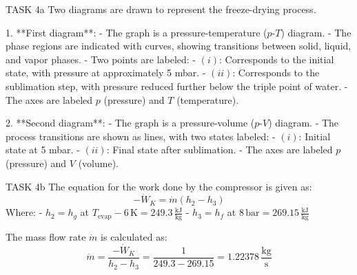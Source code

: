 TASK 4a  
Two diagrams are drawn to represent the freeze-drying process.  

1. **First diagram**:  
   - The graph is a pressure-temperature (\( p \)-\( T \)) diagram.  
   - The phase regions are indicated with curves, showing transitions between solid, liquid, and vapor phases.  
   - Two points are labeled:  
     - \( (i) \): Corresponds to the initial state, with pressure at approximately 5 mbar.  
     - \( (ii) \): Corresponds to the sublimation step, with pressure reduced further below the triple point of water.  
   - The axes are labeled \( p \) (pressure) and \( T \) (temperature).  

2. **Second diagram**:  
   - The graph is a pressure-volume (\( p \)-\( V \)) diagram.  
   - The process transitions are shown as lines, with two states labeled:  
     - \( (i) \): Initial state at 5 mbar.  
     - \( (ii) \): Final state after sublimation.  
   - The axes are labeled \( p \) (pressure) and \( V \) (volume).  

TASK 4b  
The equation for the work done by the compressor is given as:  
\[
-\dot{W}_K = \dot{m} \left( h_2 - h_3 \right)
\]  
Where:  
- \( h_2 = h_g \) at \( T_{\text{evap}} - 6 \, \text{K} = 249.3 \, \frac{\text{kJ}}{\text{kg}} \)  
- \( h_3 = h_f \) at \( 8 \, \text{bar} = 269.15 \, \frac{\text{kJ}}{\text{kg}} \)  

The mass flow rate \( \dot{m} \) is calculated as:  
\[
\dot{m} = \frac{-\dot{W}_K}{h_2 - h_3} = \frac{1}{249.3 - 269.15} = 1.22378 \, \frac{\text{kg}}{\text{s}}
\]